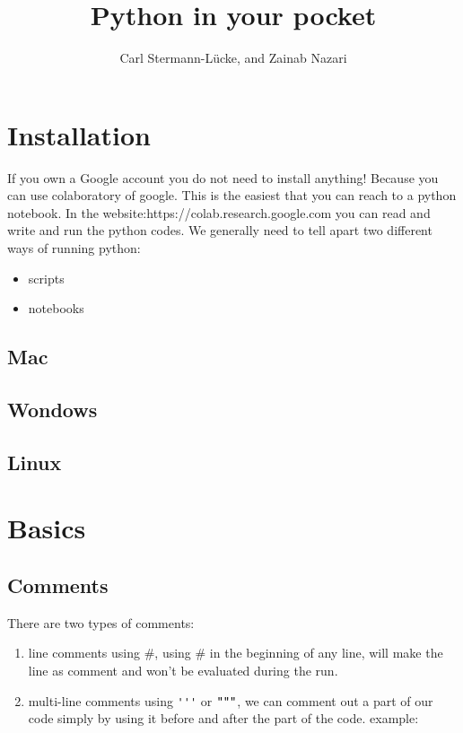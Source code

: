 \documentclass[10pt,a4paper]{article}
\author{Carl Stermann-L\"ucke, and Zainab Nazari}
\title{Python in your pocket}
\begin{document}
\maketitle
\tableofcontents
\section{Installation}
If you own a Google account you do not need to install anything! Because you can use colaboratory of google. This is the easiest that you can reach to a python notebook.
In the website:https://colab.research.google.com you can read and write and run the python codes.
We generally need to tell apart two different ways of running python:
\begin{itemize}
\item scripts
\item notebooks
\end{itemize}
\subsection{Mac}
\subsection{Wondows}
\subsection{Linux}
\section{Basics}
\subsection{Comments}
There are two types of comments:
\begin{enumerate}
\item line comments using $\#$,  using $\#$ in the beginning of any line, will make the line as comment and won't be evaluated during the run.
\item multi-line comments using \verb+'''+ or $\verb+"""+$, we can comment out a part of our code simply by using it before and after the part of the code.
example:
\end{enumerate}
\end{document}
